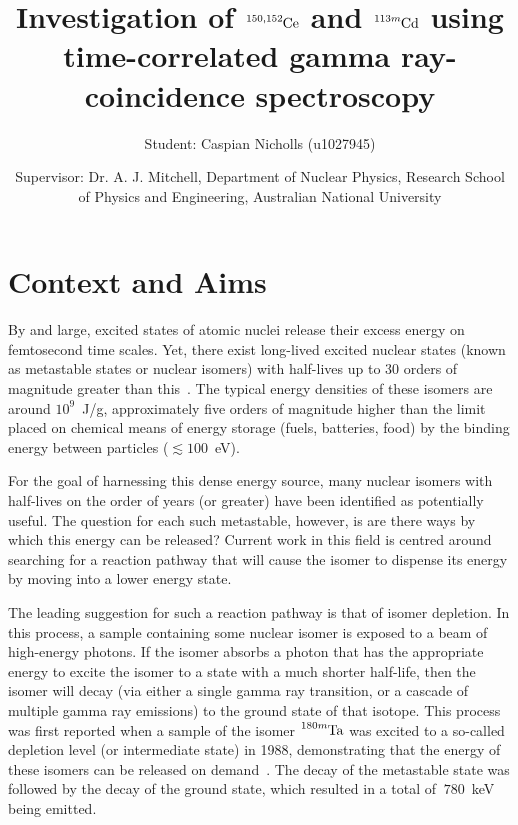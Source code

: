 \documentclass[12pt,a4paper]{article}
\begin{document}
\title{Investigation of $\ce{^{150,152}Ce}$ and $\ce{^{113m}Cd}$ using time-correlated gamma ray-coincidence spectroscopy}
\author{Student: Caspian Nicholls (u1027945)}
\date{Supervisor: Dr. A. J. Mitchell, Department of Nuclear Physics, Research School of Physics and Engineering, Australian National University}

\maketitle
\section*{Context and Aims}

\medskip
By and large, excited states of atomic nuclei release their excess energy on femtosecond time scales. Yet, there exist long-lived excited nuclear states (known as metastable states or nuclear isomers) with half-lives up to 30 orders of magnitude greater than this~\cite{shaffer_innovations_2018}. The typical energy densities of these isomers are around $10^9$~J/g, approximately five orders of magnitude higher than the limit placed on chemical means of energy storage (fuels, batteries, food) by the binding energy between particles ($\lesssim 100$~eV).

\medskip
For the goal of harnessing this dense energy source, many nuclear isomers with half-lives on the order of years (or greater) have been identified as potentially useful. The question for each such metastable, however, is are there ways by which this energy can be released? Current work in this field is centred around searching for a reaction pathway that will cause the isomer to dispense its energy by moving into a lower energy state.

\medskip
The leading suggestion for such a reaction pathway is that of isomer depletion. In this process, a sample containing some nuclear isomer is exposed to a beam of high-energy photons. If the isomer absorbs a photon that has the appropriate energy to excite the isomer to a state with a much shorter half-life, then the isomer will decay (via either a single gamma ray transition, or a cascade of multiple gamma ray emissions) to the ground state of that isotope. This process was first reported when a sample of the isomer $\ce{^{180m}Ta}$ was excited to a so-called depletion level (or intermediate state) in 1988, demonstrating that the energy of these isomers can be released on demand~\cite{collins_depopulation_1988}. The decay of the metastable state was followed by the decay of the ground state, which resulted in a total of $~780$~keV being emitted. 
\end{document}
